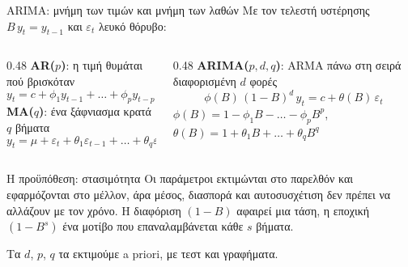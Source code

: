 \documentclass[aspectratio=169,10pt]{beamer}
\newcommand{\muted}[1]{\textcolor{muted}{#1}}
\begin{document}
\begin{frame}{ARIMA: μνήμη των τιμών και μνήμη των λαθών}
  \small
  Με τον τελεστή υστέρησης $B\,y_t = y_{t-1}$ και $\varepsilon_t$ λευκό θόρυβο:
  \vspace{0.3em}

  \begin{columns}[T, onlytextwidth]
    \begin{column}{0.48\textwidth}
      \textbf{AR($p$)}: η τιμή θυμάται πού βρισκόταν
      \[ y_t = c + \phi_1 y_{t-1} + \dots + \phi_p y_{t-p} + \varepsilon_t \]
      \textbf{MA($q$)}: ένα ξάφνιασμα κρατά $q$ βήματα
      \[ y_t = \mu + \varepsilon_t + \theta_1 \varepsilon_{t-1} + \dots + \theta_q \varepsilon_{t-q} \]
    \end{column}
    \begin{column}{0.48\textwidth}
      \textbf{ARIMA($p, d, q$)}: ARMA πάνω στη σειρά διαφορισμένη $d$ φορές
      \[ \phi(B)\,(1 - B)^d\, y_t = c + \theta(B)\,\varepsilon_t \]
      \muted{$\phi(B) = 1 - \phi_1 B - \dots - \phi_p B^p$, \quad $\theta(B) = 1 + \theta_1 B + \dots + \theta_q B^q$}
    \end{column}
  \end{columns}

  \vspace{0.8em}
  \begin{block}{Η προϋπόθεση: στασιμότητα}
    Οι παράμετροι εκτιμώνται στο παρελθόν και εφαρμόζονται στο μέλλον, άρα μέσος, διασπορά και αυτοσυσχέτιση δεν πρέπει να αλλάζουν με τον χρόνο. Η διαφόριση $(1 - B)$ αφαιρεί μια τάση, η εποχική $(1 - B^{s})$ ένα μοτίβο που επαναλαμβάνεται κάθε $s$ βήματα.
  \end{block}
  \vspace{0.3em}
  Τα $d$, $p$, $q$ τα εκτιμούμε \alert{a priori}, με τεστ και γραφήματα.
\end{frame}
\end{document}
